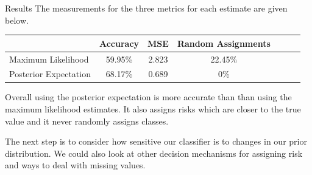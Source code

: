 \documentclass{beamer}
\begin{document}
\begin{frame}
\begin{columns}
\begin{column}{0.30\paperwidth}
		\begin{block}{Results}
			The measurements for the three metrics for each estimate are given below.
			\begin{center}
				\begin{tabular}{ l|c c c c c c }
					                      & Accuracy & MSE   & Random Assignments\\
					\hline
					Maximum Likelihood    & 59.95\%  & 2.823 & 22.45\% \\
					Posterior Expectation & 68.17\%  & 0.689 & 0\%
				\end{tabular}
			\end{center}
			Overall using the posterior expectation is more accurate than than using the maximum likelihood estimates. It also assigns risks which are closer to the true value and it never randomly assigns classes.\vspace{0.5em}

			The next step is to consider how sensitive our classifier is to changes in our prior distribution. We could also look at other decision mechanisms for assigning risk and ways to deal with missing values.
		\end{block}

	\end{column}
\end{columns}
\end{frame}
\end{document}
